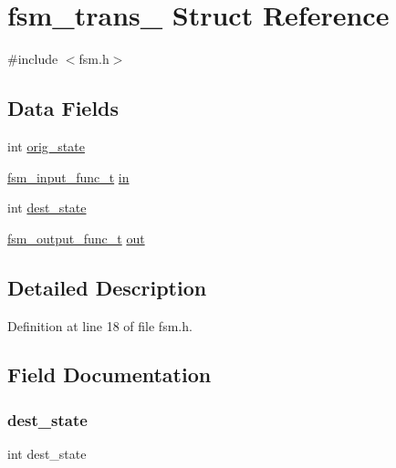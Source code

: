 \hypertarget{structfsm__trans__}{}\section{fsm\+\_\+trans\+\_\+ Struct Reference}
\label{structfsm__trans__}


{\ttfamily \#include $<$fsm.\+h$>$}

\subsection*{Data Fields}
\begin{DoxyCompactItemize}
\item 
int \mbox{\hyperlink{structfsm__trans___acfe7a3cb63b43b68f70e8b2f0bd88757}{orig\+\_\+state}}
\item 
\mbox{\hyperlink{fsm_8h_a5cf8c1afee6b2907959c75bb0ad53f38}{fsm\+\_\+input\+\_\+func\+\_\+t}} \mbox{\hyperlink{structfsm__trans___af82b44bc4d66c5b28d20c2a10ae428c6}{in}}
\item 
int \mbox{\hyperlink{structfsm__trans___a053918e1685191f0c043e582d59de7bb}{dest\+\_\+state}}
\item 
\mbox{\hyperlink{fsm_8h_ab9f0952fdbd6e84f1faa86547e1b42f5}{fsm\+\_\+output\+\_\+func\+\_\+t}} \mbox{\hyperlink{structfsm__trans___ac53985355b5ddaaba48ab1396e2c7240}{out}}
\end{DoxyCompactItemize}


\subsection{Detailed Description}


Definition at line 18 of file fsm.\+h.



\subsection{Field Documentation}
\mbox{\label{structfsm__trans___a053918e1685191f0c043e582d59de7bb}} 
\subsubsection{\texorpdfstring{dest\+\_\+state}{dest\_state}}
{\footnotesize\ttfamily int dest\+\_\+state}



